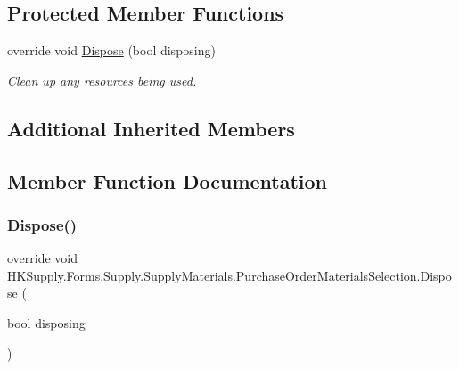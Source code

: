 \subsection*{Protected Member Functions}
\begin{DoxyCompactItemize}
\item 
override void \mbox{\hyperlink{class_h_k_supply_1_1_forms_1_1_supply_1_1_supply_materials_1_1_purchase_order_materials_selection_a897686794482467612a53dd73664670e}{Dispose}} (bool disposing)
\begin{DoxyCompactList}\small\item\em Clean up any resources being used. \end{DoxyCompactList}\end{DoxyCompactItemize}
\subsection*{Additional Inherited Members}


\subsection{Member Function Documentation}
\mbox{\label{class_h_k_supply_1_1_forms_1_1_supply_1_1_supply_materials_1_1_purchase_order_materials_selection_a897686794482467612a53dd73664670e}} 
\subsubsection{\texorpdfstring{Dispose()}{Dispose()}}
{\footnotesize\ttfamily override void H\+K\+Supply.\+Forms.\+Supply.\+Supply\+Materials.\+Purchase\+Order\+Materials\+Selection.\+Dispose (\begin{DoxyParamCaption}\item[{bool}]{disposing }\end{DoxyParamCaption})\hspace{0.3cm}{\ttfamily [protected]}}



